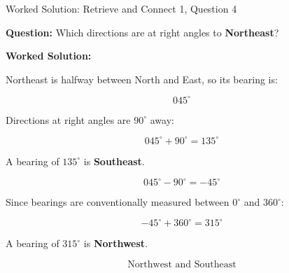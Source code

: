 \documentclass[aspectratio=169,11pt]{beamer}
\begin{document}
\begin{frame}{Worked Solution: Retrieve and Connect 1, Question 4}

\textbf{Question:} Which directions are at right angles to \textbf{Northeast}?

\textbf{Worked Solution:}

Northeast is halfway between North and East, so its bearing is:

\[
045^\circ
\]

Directions at right angles are \(90^\circ\) away:

\[
045^\circ + 90^\circ = 135^\circ
\]

A bearing of \(135^\circ\) is \textbf{Southeast}.

\[
045^\circ - 90^\circ = -45^\circ
\]

Since bearings are conventionally measured between \(0^\circ\) and \(360^\circ\):

\[
-45^\circ + 360^\circ = 315^\circ
\]

A bearing of \(315^\circ\) is \textbf{Northwest}.

\[
\boxed{\text{Northwest and Southeast}}
\]

\end{frame}
\end{document}
